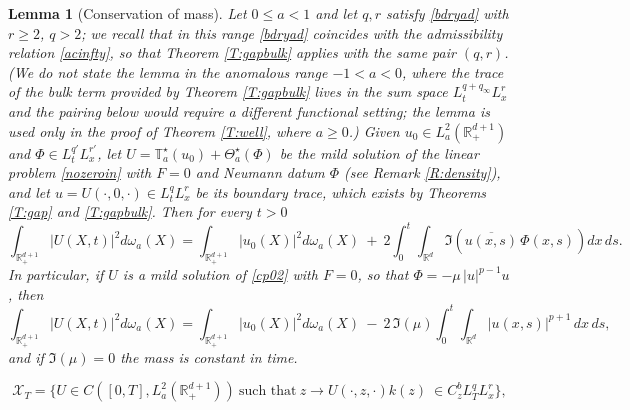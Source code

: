 \documentclass[10pt,a4paper]{amsart}
\newtheorem{lemma}{Lemma}
\def \RN {\mathbb{R}_+^{d+1}}
\newcommand{\Rd}{\mathbb R^d}
\newcommand{\XT}{\mathcal{X}_T}
\begin{document}
\begin{lemma}[Conservation of mass]\label{L:masscon}
Let $0\le a<1$ and let $q, r$ satisfy \eqref{bdryad} with $r\ge2$, $q>2$; we recall that in this range \eqref{bdryad} coincides with the admissibility relation \eqref{acinfty}, so that Theorem \ref{T:gapbulk} applies with the same pair $(q,r)$. (We do not state the lemma in the anomalous range $-1<a<0$, where the trace of the bulk term provided by Theorem \ref{T:gapbulk} lives in the sum space $L^{q+q_\infty}_t L^r_x$ and the pairing below would require a different functional setting; the lemma is used only in the proof of Theorem \ref{T:well}, where $a\ge0$.) Given $u_0\in L^2_a(\RN)$ and $\Phi\in L^{q'}_tL^{r'}_x$, let $U = \mathbb T^\star_a(u_0) + \Theta^\star_a(\Phi)$ be the mild solution of the linear problem \eqref{nozeroin} with $F=0$ and Neumann datum $\Phi$ (see Remark \ref{R:density}), and let $u = U(\cdot,0,\cdot)\in L^q_tL^r_x$ be its boundary trace, which exists by Theorems \ref{T:gap} and \ref{T:gapbulk}. Then for every $t>0$
\begin{equation}\label{timeder}
\int_{\RN} |U(X,t)|^2 d\omega_a(X) = \int_{\RN} |u_0(X)|^2 d\omega_a(X)\ +\ 2\int_0^t\int_{\Rd} \Im\left(\overline{u(x,s)}\, \Phi(x,s)\right) dx\, ds .
\end{equation}
In particular, if $U$ is a mild solution of \eqref{cp02} with $F=0$, so that $\Phi = -\mu\,|u|^{p-1}u$, then
\begin{equation}\label{timeder2}
\int_{\RN} |U(X,t)|^2 d\omega_a(X) = \int_{\RN} |u_0(X)|^2 d\omega_a(X)\ -\ 2\,\Im(\mu) \int_0^t\int_{\Rd} |u(x,s)|^{p+1}\, dx\, ds,
\end{equation}
and if $\Im(\mu) = 0$ the \emph{mass} is constant in time.
\end{lemma}

\begin{equation}\label{Xneg}
\XT = \{U\in C([0,T],L^2_a(\RN))\ \text{such that}\  z\to U(\cdot,z,\cdot) k(z)\ \in C^b_z L^q_T L^r_x \},
\end{equation}
\end{document}
